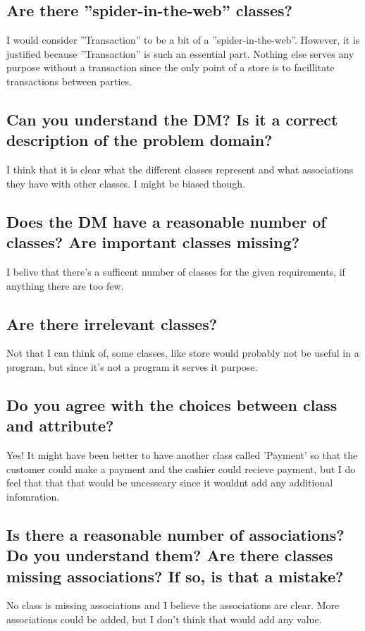 \documentclass[a4paper]{scrreprt}
\begin{document}
        \subsection{Are there ''spider-in-the-web'' classes?}
            I would consider ''Transaction'' to be a bit of a ''spider-in-the-web''.
            However, it is justified because ''Transaction'' is such an essential
            part. Nothing else serves any purpose without a transaction since the
            only point of a store is to facillitate transactions between parties.
            
        \subsection{Can you understand the DM? Is it a correct description of the problem domain?}
            I think that it is clear what the different classes represent and what
            associations they have with other classes. I might be biased though.

        \subsection{Does the DM have a reasonable number of classes? Are important classes missing?}
            I belive that there's a sufficent number of classes for the given
            requirements, if anything there are too few.

        \subsection{Are there irrelevant classes?}
            Not that I can think of, some classes, like store would probably not
            be useful in a program, but since it's not a program it serves it
            purpose.

        \subsection{Do you agree with the choices between class and attribute?}
            Yes! It might have been better to have another class called 'Payment'
            so that the customer could make a payment and the cashier could
            recieve payment, but I do feel that that that would be uncesseary 
            since it wouldnt add any additional infomration.

        \subsection{Is there a reasonable number of associations? Do you understand them? Are there classes missing associations? If so, is that a mistake?}
            No class is missing associations and I believe the associations are
            clear. More associations could be added, but I don't think that 
            would add any value.
\end{document}
